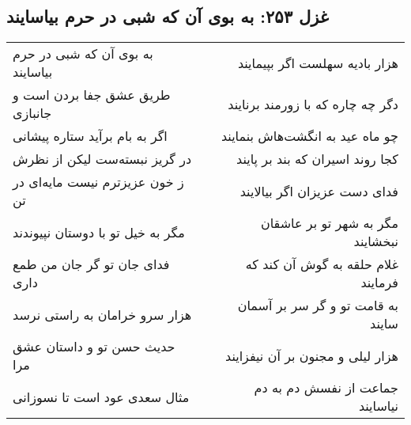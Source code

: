 \begin{center}
\section*{غزل ۲۵۳: به بوی آن که شبی در حرم بیاسایند}
\label{sec:253}
\begin{longtable}{l p{0.5cm} r}
به بوی آن که شبی در حرم بیاسایند
&&
هزار بادیه سهلست اگر بپیمایند
\\
طریق عشق جفا بردن است و جانبازی
&&
دگر چه چاره که با زورمند برنایند
\\
اگر به بام برآید ستاره پیشانی
&&
چو ماه عید به انگشت‌هاش بنمایند
\\
در گریز نبسته‌ست لیکن از نظرش
&&
کجا روند اسیران که بند بر پایند
\\
ز خون عزیزترم نیست مایه‌ای در تن
&&
فدای دست عزیزان اگر بیالایند
\\
مگر به خیل تو با دوستان نپیوندند
&&
مگر به شهر تو بر عاشقان نبخشایند
\\
فدای جان تو گر جان من طمع داری
&&
غلام حلقه به گوش آن کند که فرمایند
\\
هزار سرو خرامان به راستی نرسد
&&
به قامت تو و گر سر بر آسمان سایند
\\
حدیث حسن تو و داستان عشق مرا
&&
هزار لیلی و مجنون بر آن نیفزایند
\\
مثال سعدی عود است تا نسوزانی
&&
جماعت از نفسش دم به دم نیاسایند
\\
\end{longtable}
\end{center}
